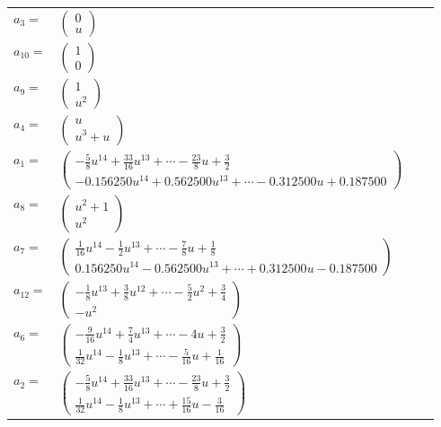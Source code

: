 \documentclass[1p]{elsarticle_modified}
\theoremstyle{definition}
\begin{document}
\begin{tabular}{m{7pt} m{180pt} m{7pt} m{180pt} }
\flushright $a_{3}=$&$\begin{pmatrix}0\\u\end{pmatrix}$ \\
\flushright $a_{10}=$&$\begin{pmatrix}1\\0\end{pmatrix}$ \\
\flushright $a_{9}=$&$\begin{pmatrix}1\\u^2\end{pmatrix}$ \\
\flushright $a_{4}=$&$\begin{pmatrix}u\\u^3+u\end{pmatrix}$ \\
\flushright $a_{1}=$&$\begin{pmatrix}-\frac{5}{8} u^{14}+\frac{33}{16} u^{13}+\cdots-\frac{23}{8} u+\frac{3}{2}\\-0.156250 u^{14}+0.562500 u^{13}+\cdots-0.312500 u+0.187500\end{pmatrix}$ \\
\flushright $a_{8}=$&$\begin{pmatrix}u^2+1\\u^2\end{pmatrix}$ \\
\flushright $a_{7}=$&$\begin{pmatrix}\frac{1}{16} u^{14}-\frac{1}{2} u^{13}+\cdots-\frac{7}{8} u+\frac{1}{8}\\0.156250 u^{14}-0.562500 u^{13}+\cdots+0.312500 u-0.187500\end{pmatrix}$ \\
\flushright $a_{12}=$&$\begin{pmatrix}-\frac{1}{8} u^{13}+\frac{3}{8} u^{12}+\cdots-\frac{5}{2} u^2+\frac{3}{4}\\- u^2\end{pmatrix}$ \\
\flushright $a_{6}=$&$\begin{pmatrix}-\frac{9}{16} u^{14}+\frac{7}{4} u^{13}+\cdots-4 u+\frac{3}{2}\\\frac{1}{32} u^{14}-\frac{1}{8} u^{13}+\cdots-\frac{5}{16} u+\frac{1}{16}\end{pmatrix}$ \\
\flushright $a_{2}=$&$\begin{pmatrix}-\frac{5}{8} u^{14}+\frac{33}{16} u^{13}+\cdots-\frac{23}{8} u+\frac{3}{2}\\\frac{1}{32} u^{14}-\frac{1}{8} u^{13}+\cdots+\frac{15}{16} u-\frac{3}{16}\end{pmatrix}$ \\

\end{tabular}
\end{document}
